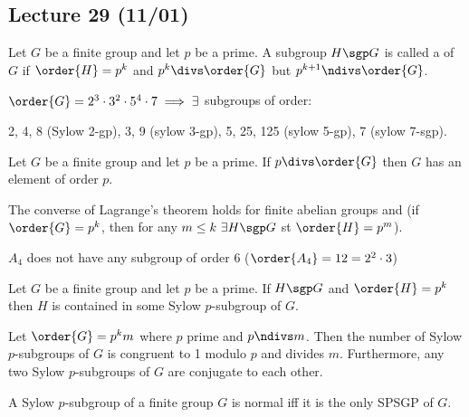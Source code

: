 \subsection*{Lecture 29 (11/01)} %
\begin{definition}
    Let \(G\) be a finite group and let \(p\) be a prime. A subgroup \(H\sgp G\) is called a  of \(G\) if \(\order{H} = p^k\) and \(p^k\divs \order{G}\) but \(p^{k+1}\ndivs \order{G}\).
\end{definition}

\begin{example}
  \(\order{G}=2^3\cdot 3^2\cdot 5^4\cdot 7 \implies \exists\) subgroups of order:

  2, 4, 8 (Sylow 2-gp), 3, 9 (sylow 3-gp), 5, 25, 125 (sylow 5-gp), 7 (sylow 7-sgp).
\end{example}

\begin{corollary}
    Let \(G\) be a finite group and let \(p\) be a prime. If \(p\divs \order{G}\) then \(G\) has an element of order \(p\).
\end{corollary}

\begin{corollary}
  The converse of Lagrange's theorem holds for finite abelian groups and   (if \(\order{G} = p^k\), then for any \(m\leq k\ \exists H \sgp G\) st \(\order{H}=p^m\)).
\end{corollary}

\begin{fact}
  \(A_4\) does not have any subgroup of order 6 (\(\order{A_4} = 12 = 2^2 \cdot 3\))
\end{fact}

\begin{theorem}
  Let \(G\) be a finite group and let \(p\) be a prime. If \(H\sgp G\) and \(\order{H}=p^k\) then \(H\) is contained in some Sylow \(p\)-subgroup of \(G\).
\end{theorem}

\begin{theorem}
  Let \(\order{G}=p^km\) where \(p\) prime and \(p\ndivs m\). Then the number of Sylow \(p\)-subgroups of \(G\) is congruent to 1 modulo \(p\) and divides \(m\). Furthermore, any two Sylow \(p\)-subgroups of \(G\) are conjugate to each other.
\end{theorem}

\begin{corollary}
  A Sylow \(p\)-subgroup of a finite group \(G\) is normal iff it is the only SPSGP of \(G\).
\end{corollary}

